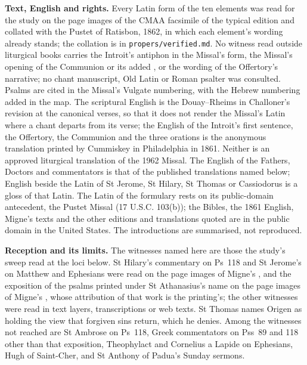 {\textbf{Text, English and rights.} Every Latin form of the ten elements was read
for the study on the page images of the CMAA facsimile of the typical edition and
collated with the Pustet  of Ratisbon, 1862, in which each
element's wording already stands; the collation is in
\texttt{propers/verified.md}. No witness read outside liturgical books carries the
Introit's antiphon in the Missal's form, the Missal's opening of the Communion or
its added , or the wording of the Offertory's narrative; no
chant manuscript, Old Latin or Roman psalter was consulted. Psalms are cited in the
Missal's Vulgate numbering, with the Hebrew numbering added in the map. The
scriptural English is the Douay--Rheims in Challoner's revision at the canonical
verses, so that it does not render the Missal's Latin where a chant departs from
its verse; the English of the Introit's first sentence, the Offertory, the
Communion and the three orations is the anonymous translation printed by Cummiskey
in Philadelphia in 1861. Neither is an approved liturgical translation of the 1962
Missal. The English of the Fathers, Doctors and commentators is that of the
published translations named below; English beside the Latin of St Jerome, St
Hilary, St Thomas or Cassiodorus is a gloss of that Latin. The Latin of the
formulary rests on its public-domain antecedent, the Pustet Missal (17 U.S.C.
103(b)); the Bibles, the 1861 English, Migne's texts and the other editions and
translations quoted are in the public domain in the United States. The  introductions are summarised, not reproduced.

\textbf{Reception and its limits.} The witnesses named here are those the study's
sweep read at the loci below. St Hilary's commentary on Ps~118 and St Jerome's on
Matthew and Ephesians were read on the page images of Migne's , and the exposition of the psalms printed under St Athanasius's name on
the page images of Migne's , whose attribution of that
work is the printing's; the other witnesses were read in text layers,
transcriptions or web texts. St Thomas names Origen as holding the view that
forgiven sins return, which he denies. Among the witnesses not reached are St
Ambrose on Ps~118, Greek commentators on Pss~89 and 118 other than that
exposition, Theophylact and Cornelius a Lapide on Ephesians, Hugh of Saint-Cher,
and St Anthony of Padua's Sunday sermons.

}
